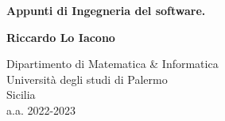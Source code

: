 \documentclass{subfiles}
\begin{document}
\begin{titlepage}
    \begin{center}
        \vspace*{1cm}

        \textbf{Appunti di Ingegneria del software.}

        \vspace{1.5cm}

        \textbf{Riccardo Lo Iacono}

        \vfill

        \vspace{0.8cm}

        Dipartimento di Matematica \& Informatica\\
        Università degli studi di Palermo\\
        Sicilia\\
        a.a. 2022-2023

    \end{center}
\end{titlepage}
\end{document}

